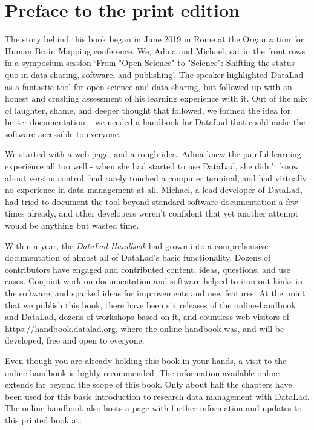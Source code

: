 \chapter*{Preface to the print edition}

The story behind this book began in June 2019 in Rome at the Organization for
Human Brain Mapping conference. We, Adina and Michael, sat in the front rows in
a symposium session ‘From "Open Science" to "Science": Shifting the status quo
in data sharing, software, and publishing’. The speaker highlighted DataLad as
a fantastic tool for open science and data sharing, but followed up with an
honest and crushing assessment of his learning experience with it. Out of the
mix of laughter, shame, and deeper thought that followed, we formed the idea
for better documentation -- we needed a handbook for DataLad that could make the
software accessible to everyone.

We started with a web page, and a rough idea. Adina knew the painful learning
experience all too well - when she had started to use DataLad, she didn’t know
about version control, had rarely touched a computer terminal, and had virtually no
experience in data management at all. Michael, a lead developer of DataLad, had
tried to document the tool beyond standard software documentation a few times
already, and other developers weren’t confident that yet another attempt would
be anything but wasted time.

Within a year, the \textit{DataLad Handbook} had grown into a comprehensive
documentation of almost all of DataLad’s basic functionality. Dozens of
contributors have engaged and contributed content, ideas, questions, and use
cases. Conjoint work on documentation and software helped to iron out kinks in
the software, and sparked ideas for improvements and new features. At the point
that we publish this book, there have been six releases of the
online-handbook and DataLad, dozens of workshops based on it, and countless web
visitors of \url{https://handbook.datalad.org}, where the online-handbook was, and will be
developed, free and open to everyone.

Even though you are already holding this book in your hands, a visit to the
online-handbook is highly recommended. The information available online extends
far beyond the scope of this book. Only about half the chapters have been used
for this basic introduction to research data management with DataLad. The
online-handbook also hosts a page with further information and updates to this
printed book at:

